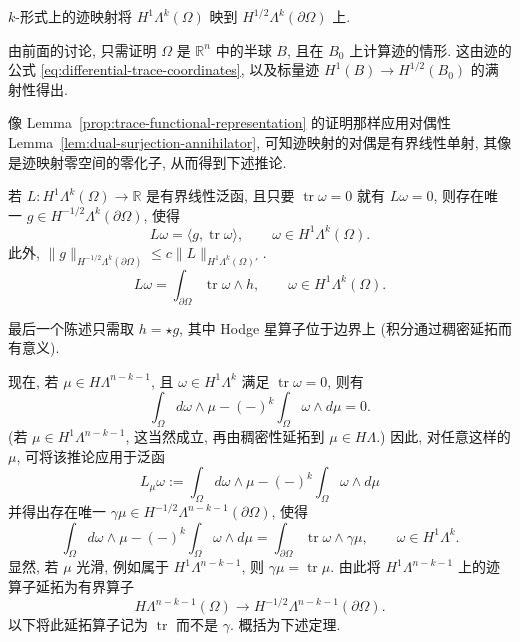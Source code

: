 \begin{Theorem}\label{thm:forms-h1-trace-surjectivity}
$k$-形式上的迹映射将 $H^1\Lambda^k(\Omega)$ 映到 $H^{1/2}\Lambda^k(\partial\Omega)$ 上.
\end{Theorem}

\begin{Proof}
由前面的讨论, 只需证明 $\Omega$ 是 $\mathbb R^n$ 中的半球 $B$, 且在 $B_0$ 上计算迹的情形. 这由迹的公式 \eqref{eq:differential-trace-coordinates}, 以及标量迹 $H^1(B)\to H^{1/2}(B_0)$ 的满射性得出.
\end{Proof}

像 Lemma~\ref{prop:trace-functional-representation} 的证明那样应用对偶性 Lemma~\ref{lem:dual-surjection-annihilator}, 可知迹映射的对偶是有界线性单射, 其像是迹映射零空间的零化子, 从而得到下述推论.

\begin{Corollary}\label{cor:forms-trace-functional-representation}
若 $L:H^1\Lambda^k(\Omega)\to\mathbb R$ 是有界线性泛函, 且只要 $\operatorname{tr}\omega=0$ 就有 $L\omega=0$, 则存在唯一 $g\in H^{-1/2}\Lambda^k(\partial\Omega)$, 使得
\[
L\omega=\langle g,\operatorname{tr}\omega\rangle,\qquad\omega\in H^1\Lambda^k(\Omega).
\]
此外, $\|g\|_{H^{-1/2}\Lambda^k(\partial\Omega)}\leq c\|L\|_{H^1\Lambda^k(\Omega)'}$.
\[
L\omega=\int_{\partial\Omega}\operatorname{tr}\omega\wedge h,\qquad\omega\in H^1\Lambda^k(\Omega).
\]
\end{Corollary}

最后一个陈述只需取 $h=\star g$, 其中 Hodge 星算子位于边界上 (积分通过稠密延拓而有意义).

现在, 若 $\mu\in H\Lambda^{n-k-1}$, 且 $\omega\in H^1\Lambda^k$ 满足 $\operatorname{tr}\omega=0$, 则有
\[
\int_\Omega d\omega\wedge\mu-(-)^k\int_\Omega\omega\wedge d\mu=0.
\]
(若 $\mu\in H^1\Lambda^{n-k-1}$, 这当然成立, 再由稠密性延拓到 $\mu\in H\Lambda$.) 因此, 对任意这样的 $\mu$, 可将该推论应用于泛函
\[
L_\mu\omega:=\int_\Omega d\omega\wedge\mu-(-)^k\int_\Omega\omega\wedge d\mu
\]
并得出存在唯一 $\gamma\mu\in H^{-1/2}\Lambda^{n-k-1}(\partial\Omega)$, 使得
\[
\int_\Omega d\omega\wedge\mu-(-)^k\int_\Omega\omega\wedge d\mu=\int_{\partial\Omega}\operatorname{tr}\omega\wedge\gamma\mu,\qquad\omega\in H^1\Lambda^k.
\]
显然, 若 $\mu$ 光滑, 例如属于 $H^1\Lambda^{n-k-1}$, 则 $\gamma\mu=\operatorname{tr}\mu$. 由此将 $H^1\Lambda^{n-k-1}$ 上的迹算子延拓为有界算子
\[
H\Lambda^{n-k-1}(\Omega)\to H^{-1/2}\Lambda^{n-k-1}(\partial\Omega).
\]
以下将此延拓算子记为 $\operatorname{tr}$ 而不是 $\gamma$. 概括为下述定理.

